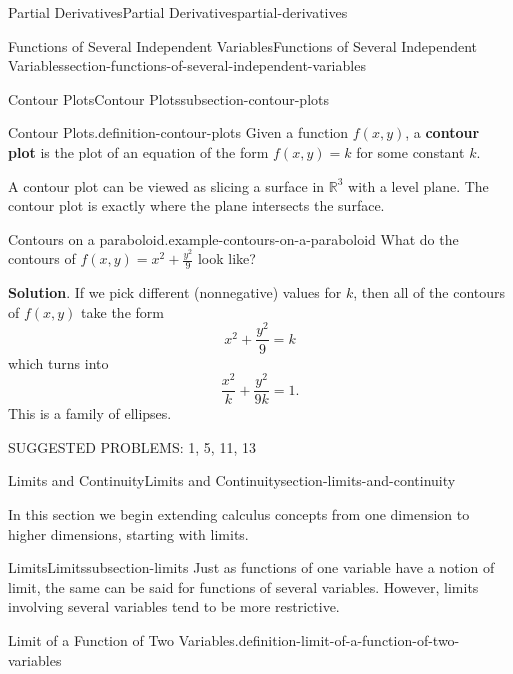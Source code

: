 \documentclass[oneside,10pt,]{book}
\newcommand{\terminology}[1]{\textbf{#1}}
\numberwithin{equation}{section}
\newcommand{\RR}{\mathbb{R}}
\begin{document}
\begin{chapterptx}{Partial Derivatives}{}{Partial Derivatives}{}{}{partial-derivatives}
\begin{sectionptx}{Functions of Several Independent Variables}{}{Functions of Several Independent Variables}{}{}{section-functions-of-several-independent-variables}
\begin{subsectionptx}{Contour Plots}{}{Contour Plots}{}{}{subsection-contour-plots}
\begin{definition}{Contour Plots.}{definition-contour-plots}
\hypertarget{p-1336}{}%
Given a function \(f(x,y)\), a \terminology{contour plot} is the plot of an equation of the form \(f(x,y) = k\) for some constant \(k\).%
\end{definition}
\hypertarget{p-1337}{}%
A contour plot can be viewed as slicing a surface in \(\RR^{3}\) with a level plane. The contour plot is exactly where the plane intersects the surface.%
\begin{example}{Contours on a paraboloid.}{example-contours-on-a-paraboloid}%
\hypertarget{p-1338}{}%
What do the contours of \(f(x,y) = x^{2} + \frac{y^{2}}{9}\) look like?%
\par\smallskip%
\noindent\textbf{Solution}.\hypertarget{solution-213}{}\quad%
\hypertarget{p-1339}{}%
If we pick different (nonnegative) values for \(k\), then all of the contours of \(f(x,y)\) take the form%
\begin{equation*}
x^{2} + \frac{y^{2}}{9} = k
\end{equation*}
which turns into%
\begin{equation*}
\frac{x^{2}}{k} + \frac{y^{2}}{{9k}} = 1.
\end{equation*}
This is a family of ellipses.%
\end{example}
\end{subsectionptx}
\hypertarget{p-1340}{}%
SUGGESTED PROBLEMS: 1, 5, 11, 13%
\end{sectionptx}
%
%
\typeout{************************************************}
\typeout{************************************************}
%
\begin{sectionptx}{Limits and Continuity}{}{Limits and Continuity}{}{}{section-limits-and-continuity}
\begin{introduction}{}%
\hypertarget{p-1341}{}%
In this section we begin extending calculus concepts from one dimension to higher dimensions, starting with limits.%
\end{introduction}%
%
%
\typeout{************************************************}
\typeout{************************************************}
%
\begin{subsectionptx}{Limits}{}{Limits}{}{}{subsection-limits}
\hypertarget{p-1342}{}%
Just as functions of one variable have a notion of limit, the same can be said for functions of several variables. However, limits involving several variables tend to be more restrictive.%
\begin{definition}{Limit of a Function of Two Variables.}{definition-limit-of-a-function-of-two-variables}%

\end{definition}
\end{subsectionptx}
\end{sectionptx}
\end{chapterptx}
\end{document}
